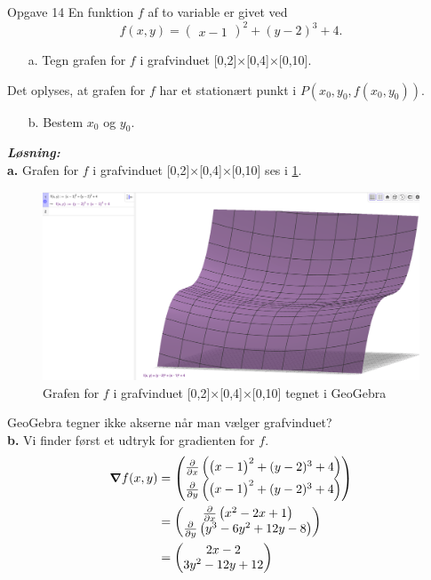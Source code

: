 \documentclass{article}
\newcommand{\sol}{\setlength{\parindent}{0cm}\textbf{\textit{Løsning:}}\setlength{\parindent}{1cm}}
\begin{document}
\begin{question}{Opgave 14}{}
  En funktion $f$ af to variable er givet ved
$$f(x,y)=\begin{pmatrix}x-1\end{pmatrix}^2+(y-2)^3+4.$$
\begin{itemize}
  \item[a.] Tegn grafen for $f$ i grafvinduet [0,2]×[0,4]×[0,10].
\end{itemize}
Det oplyses, at grafen for $f$ har et stationært punkt i $P(x_0,y_0,f(x_0,y_0)).$
\begin{itemize}
  \item[b.] Bestem $x_0$ og $y_0.$
\end{itemize}
\end{question}
\sol \\
\textbf{a.}
Grafen for $f$ i grafvinduet [0,2]×[0,4]×[0,10] ses i \cref{fig:tovar}.
\begin{figure}[H]
\begin{center}
  \includegraphics[width=\textwidth]{tovar.png}
\end{center}
\caption{Grafen for $f$ i grafvinduet [0,2]×[0,4]×[0,10] tegnet i GeoGebra}
\label{fig:tovar}
\end{figure}
GeoGebra tegner ikke akserne når man vælger grafvinduet? \\[1ex]
\textbf{b.}
Vi finder først et udtryk for gradienten for $f$.
\begin{equation*}
\begin{split}
  \grad f(x,y)&= \mqty(\pdv{x} \left(\begin{pmatrix}x-1\end{pmatrix}^2+(y-2)^3+4\right) \\ \pdv{y} \left(\begin{pmatrix}x-1\end{pmatrix}^2+(y-2)^3+4\right) ) \\
  &=\mqty(\pdv{x} \left(x^2-2x+1\right) \\ \pdv{y} \left(y^3-6y^2+12y-8\right) ) \\
  &=\mqty(2x-2\\ 3y^2-12y+12) 
\end{split}
\end{equation*}
\end{document}
